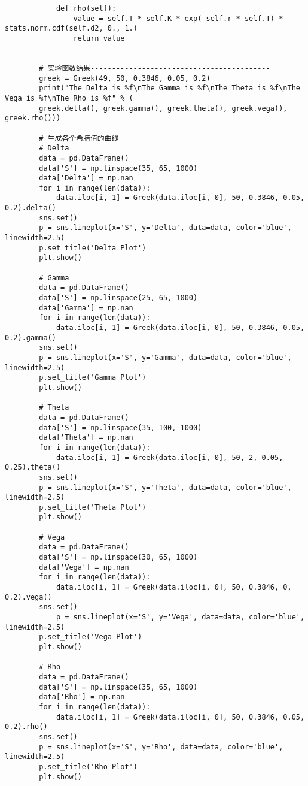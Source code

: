 \documentclass{ctexart}
\begin{document}
\begin{lstlisting}
            def rho(self):
                value = self.T * self.K * exp(-self.r * self.T) * stats.norm.cdf(self.d2, 0., 1.)
                return value


        # 实验函数结果------------------------------------------
        greek = Greek(49, 50, 0.3846, 0.05, 0.2)
        print("The Delta is %f\nThe Gamma is %f\nThe Theta is %f\nThe Vega is %f\nThe Rho is %f" % (
        greek.delta(), greek.gamma(), greek.theta(), greek.vega(), greek.rho()))

        # 生成各个希腊值的曲线
        # Delta
        data = pd.DataFrame()
        data['S'] = np.linspace(35, 65, 1000)
        data['Delta'] = np.nan
        for i in range(len(data)):
            data.iloc[i, 1] = Greek(data.iloc[i, 0], 50, 0.3846, 0.05, 0.2).delta()
        sns.set()
        p = sns.lineplot(x='S', y='Delta', data=data, color='blue', linewidth=2.5)
        p.set_title('Delta Plot')
        plt.show()

        # Gamma
        data = pd.DataFrame()
        data['S'] = np.linspace(25, 65, 1000)
        data['Gamma'] = np.nan
        for i in range(len(data)):
            data.iloc[i, 1] = Greek(data.iloc[i, 0], 50, 0.3846, 0.05, 0.2).gamma()
        sns.set()
        p = sns.lineplot(x='S', y='Gamma', data=data, color='blue', linewidth=2.5)
        p.set_title('Gamma Plot')
        plt.show()

        # Theta
        data = pd.DataFrame()
        data['S'] = np.linspace(35, 100, 1000)
        data['Theta'] = np.nan
        for i in range(len(data)):
            data.iloc[i, 1] = Greek(data.iloc[i, 0], 50, 2, 0.05, 0.25).theta()
        sns.set()
        p = sns.lineplot(x='S', y='Theta', data=data, color='blue', linewidth=2.5)
        p.set_title('Theta Plot')
        plt.show()

        # Vega
        data = pd.DataFrame()
        data['S'] = np.linspace(30, 65, 1000)
        data['Vega'] = np.nan
        for i in range(len(data)):
            data.iloc[i, 1] = Greek(data.iloc[i, 0], 50, 0.3846, 0, 0.2).vega()
        sns.set()
            p = sns.lineplot(x='S', y='Vega', data=data, color='blue', linewidth=2.5)
        p.set_title('Vega Plot')
        plt.show()

        # Rho
        data = pd.DataFrame()
        data['S'] = np.linspace(35, 65, 1000)
        data['Rho'] = np.nan
        for i in range(len(data)):
            data.iloc[i, 1] = Greek(data.iloc[i, 0], 50, 0.3846, 0.05, 0.2).rho()
        sns.set()
        p = sns.lineplot(x='S', y='Rho', data=data, color='blue', linewidth=2.5)
        p.set_title('Rho Plot')
        plt.show()

    \end{lstlisting} 
\end{document}

